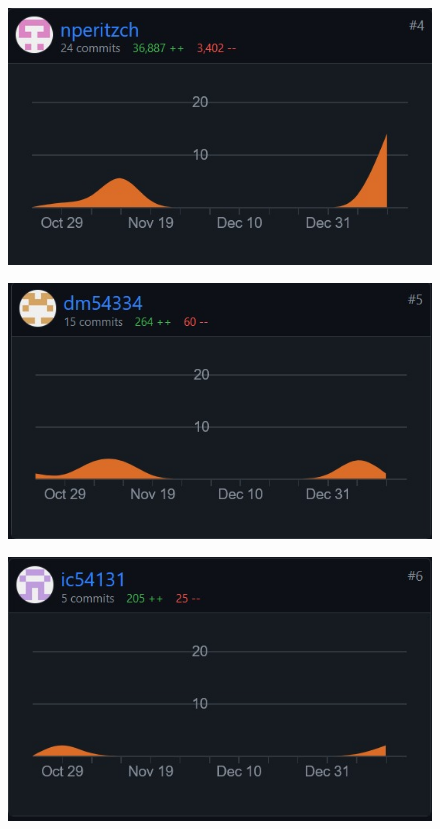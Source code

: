 		\begin{figure}[H]
			\includegraphics[width=\textwidth]{slike/nikola.JPG}
			\label{nikolaDiagram}
		\end{figure}
		
		\begin{figure}[H]
			\includegraphics[width=\textwidth]{slike/diego.JPG}
			\label{diegoDiagram}
		\end{figure}
		
		\begin{figure}[H]
			\includegraphics[width=\textwidth]{slike/ivan.JPG}
			\label{ivanDiagram}
		\end{figure}
		
